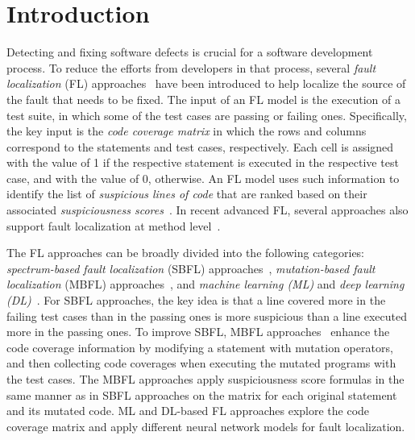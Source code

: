 \section{Introduction}

Detecting and fixing software defects is crucial for a software
development process. To reduce the efforts from developers in that
process, several {\em fault localization} (FL)
approaches~\cite{fl-survey} have been introduced to help localize the
source of the fault that needs to be fixed. The input of an FL model
is the execution of a test suite, in which some of the test cases are
passing or failing ones. Specifically, the key input is the {\em code
  coverage matrix} in which the rows and columns correspond to the
statements and test cases, respectively.  Each cell is assigned with
the value of 1 if the respective statement is executed in the
respective test case, and with the value of 0, otherwise.  An FL model
uses such information to identify the list of {\em suspicious lines of
  code} that are ranked based on their associated {\em suspiciousness
  scores}~\cite{fl-survey}. In recent advanced FL, several approaches
also support fault localization at method
level~\cite{DeepFL,icse21-fl}. 




The FL approaches can be broadly divided into the following
categories: {\em spectrum-based fault localization} (SBFL)
approaches~\cite{Ochiai,jones2001visualization,keller2017critical},
{\em mutation-based fault localization} (MBFL)
approaches~\cite{MUSE,papadakis2012using,Metallaxis}, and {\em machine
  learning (ML)} and {\em deep learning (DL)}~\cite{DeepFL,icse21-fl}.
For SBFL approaches, the key idea is that a line covered more in the
failing test cases than in the passing ones is more suspicious than a
line executed more in the passing ones.
%
To improve SBFL, MBFL
approaches~\cite{MUSE,papadakis2012using,Metallaxis} enhance the code
coverage information by modifying a statement with mutation operators,
and then collecting code coverages when executing the mutated programs
with the test cases. The MBFL approaches apply suspiciousness score
formulas in the same manner as in SBFL approaches on the matrix for
each original statement and its mutated code.
%
ML and DL-based FL approaches explore the code coverage matrix and
apply different neural network models for fault localization.


